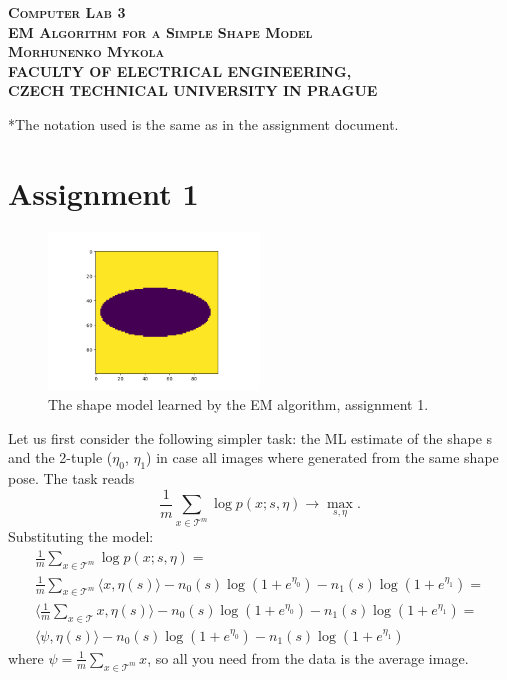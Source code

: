 \documentclass[10pt]{article}
\begin{document}
\begin{center}
\textsc{\huge \bfseries Computer Lab 3} \\[1cm]
\textsc{\huge \bfseries EM Algorithm for a Simple Shape Model} \\[2cm]
\textsc{\large \bfseries Morhunenko Mykola}\\[13cm]

\textup{\large \bfseries FACULTY OF ELECTRICAL ENGINEERING,\\ CZECH TECHNICAL UNIVERSITY IN PRAGUE}
\end{center}
\newpage



*The notation used is the same as in the assignment document.

\section{Assignment 1}
\label{sec:ass1}
\begin{figure}[H]
  \begin{center}
      \includegraphics[width=0.5\textwidth]{fig/elipsa.png}
  \end{center}
      \caption{The shape model learned by the EM algorithm, assignment 1.}
      \label{fig:sun}
\end{figure}

Let us first consider the following simpler task: the ML estimate
of the shape s and the 2-tuple ($\eta_0$, $\eta_1$) in case all images where generated from the
same shape pose. The task reads
\begin{equation}
    \frac{1}{m} \sum_{x \in \mathcal{T}^m}{ \log p(x;s, \eta)} \rightarrow{} \max_{s, \eta}.
\end{equation}
Substituting the model:
\begin{equation}
    \begin{aligned}
        \frac{1}{m} \sum_{x \in \mathcal{T}^m} { \log p(x;s, \eta)} = \\ 
        \frac{1}{m} \sum_{x \in \mathcal{T}^m} { \langle x, \eta(s) \rangle - n_0(s)\log(1 + e^{\eta_0}) - n_1(s) \log(1 + e^{\eta_1})} = \\
        \langle \frac{1}{m} \sum_{x \in \mathcal{T}} x, \eta(s) \rangle - n_0(s)\log(1 + e^{\eta_0}) - n_1(s) \log(1 + e^{\eta_1}) = \\
        \langle \psi, \eta(s) \rangle - n_0(s)\log(1 + e^{\eta_0}) - n_1(s) \log(1 + e^{\eta_1})
     \end{aligned}
\end{equation}
where $\psi = \frac{1}{m} \sum_{x \in \mathcal{T}^m} x$, so all you need from the data is the average image.
\end{document}
